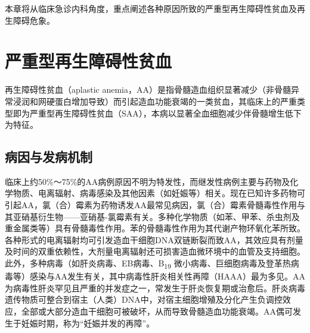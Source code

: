 本章将从临床急诊内科角度，重点阐述各种原因所致的严重型再生障碍性贫血及再生障碍危象。

\section{严重型再生障碍性贫血}

再生障碍性贫血（aplastic
anemia，AA）是指骨髓造血组织显著减少（非骨髓异常浸润和网硬蛋白增加导致）而引起造血功能衰竭的一类贫血，其临床上的严重类型即为严重型再生障碍性贫血（SAA），本病以显著全血细胞减少伴骨髓增生低下为特征。

\subsection{病因与发病机制}

临床上约50\%～75\%的AA病例原因不明为特发性，而继发性病例主要与药物及化学物质、电离辐射、病毒感染及其他因素（如妊娠等）相关。现在已知许多药物可引起AA，氯（合）霉素为药物诱发AA最常见病因，氯（合）霉素骨髓毒性作用与其亚硝基衍生物------亚硝基-氯霉素有关。多种化学物质（如苯、甲苯、杀虫剂及重金属类等）具有骨髓毒性作用。苯的骨髓毒性作用为其代谢产物环氧化苯所致。各种形式的电离辐射均可引发造血干细胞DNA双链断裂而致AA，其效应具有剂量及时间的双重依赖性，大剂量电离辐射还可损害造血微环境中的血管及支持细胞。此外，多种病毒（如肝炎病毒、EB病毒、B\textsubscript{19}
微小病毒、巨细胞病毒及登革热病毒等）感染与AA发生有关，其中病毒性肝炎相关性再障（HAAA）最为多见。AA为病毒性肝炎罕见且严重的并发症之一，常发生于肝炎恢复期或治愈后。肝炎病毒遗传物质可整合到宿主（人类）DNA中，对宿主细胞增殖及分化产生负调控效应，全部或大部分造血干细胞可被破坏，从而导致骨髓造血功能衰竭。AA偶可发生于妊娠时期，称为“妊娠并发的再障”。

